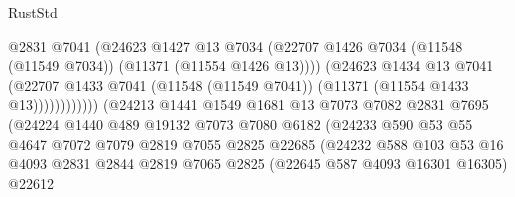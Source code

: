 \begin{lexlean}{RustStd}
\begin{coremodule}
                                          @2831
                                          @7041
                                          (@24623
                                            @1427
                                            @13
                                            @7034
                                            (@22707
                                              @1426
                                              @7034
                                              (@11548 (@11549 @7034))
                                              (@11371 (@11554 @1426 @13))))
                                          (@24623
                                            @1434
                                            @13
                                            @7041
                                            (@22707
                                              @1433
                                              @7041
                                              (@11548 (@11549 @7041))
                                              (@11371 (@11554 @1433 @13))))))))))))
                          (@24213
                            @1441
                            @1549
                            @1681
                            @13
                            @7073
                            @7082
                            @2831
                            @7695
                            (@24224
                              @1440
                              @489
                              @19132
                              @7073
                              @7080
                              @6182
                              (@24233
                                @590
                                @53
                                @55
                                @4647
                                @7072
                                @7079
                                @2819
                                @7055
                                @2825
                                @22685
                                (@24232
                                  @588
                                  @103
                                  @53
                                  @16
                                  @4093
                                  @2831
                                  @2844
                                  @2819
                                  @7065
                                  @2825
                                  (@22645 @587 @4093 @16301 @16305)
                                  @22612

\end{coremodule}
\end{lexlean}
